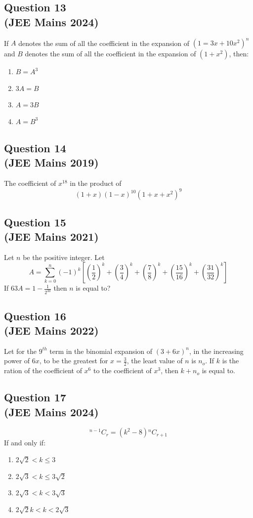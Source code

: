 \subsection*{Question 13 \\ \small(JEE Mains 2024)}
If $A$ denotes the sum of all the coefficient in the expansion of $(1=3x+10x^{2})^n$ and $B$ denotes the sum of all the coefficient in the expansion of $(1+x^2)$, then:

\begin{enumerate}
    \item $B=A^3$
    \item $3A=B$
    \item $A=3B$
    \item $A=B^3$
\end{enumerate}

\subsection*{Question 14 \\ \small(JEE Mains 2019)}
The coefficient of $x^{18}$ in the product of \[
(1+x)(1-x)^{10}(1+x+x^2)^9
\]

\subsection*{Question 15 \\ \small(JEE Mains 2021)}
Let $n$ be the positive integer. Let
\[
A = \sum_{k=0}^{n}(-1)^k[(\frac{1}{2})^k+(\frac{3}{4})^k+(\frac{7}{8})^k+(\frac{15}{16})^k+(\frac{31}{32})^k]
\] If $63A = 1-\frac{1}{2^{30}}$ then $n$ is equal to?

\subsection*{Question 16 \\ \small(JEE Mains 2022)}
Let for the $9^{th}$ term in the binomial expansion of $(3+6x)^n$, in the increasing power of $6x$, to be the greatest for $x=\frac{3}{2}$, the least value of $n$ is $n_o$. If $k$ is the ration of the coefficient of $x^6$ to the coefficient of $x^3$, then $k+n_o$ is equal to.

\subsection*{Question 17 \\ \small(JEE Mains 2024)}
\[
{}^{n-1}C_{r} = (k^2-8){}^{n}C_{r+1}
\]
If and only if: 
\begin{enumerate}
    \item $2\sqrt{2} < k \leq 3$
    \item $2\sqrt{3}< k \leq 3\sqrt{2}$
    \item $2\sqrt{3}< k< 3\sqrt{3}$
    \item $2\sqrt{2}k<k<2\sqrt{3}$
\end{enumerate}

